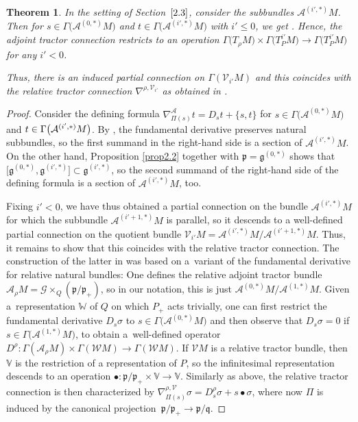 \documentclass[pdftex]{sigma}
\numberwithin{equation}{section}
\newtheorem{Theorem}{Theorem}[section]
\def\frak{\mathfrak}
\def\Bbb{\mathbb}
\def\Cal{\mathcal}
\newcommand{\x}{\times}
\newcommand{\si}{\sigma}
\newcommand{\Ga}{\Gamma}
\begin{document}
\begin{Theorem}\label{thm3.1}
In the setting of Section~$\ref{2.3}$, consider the subbundles $\Cal A^{(i',*)}M$. Then for
${s\in\Ga\bigl(\Cal A^{(0,*)}M\bigr)}$ and $t\in\Ga\bigl(\Cal A^{(i',*)}M\bigr)$ with $i'\leq 0$, we get
\smash{$\nabla^{\Cal A}_{\Pi(s)}t\in\Ga\big(\Cal A^{(i',*)}\big)M$}. Hence, the adjoint tractor
connection restricts to an operation $\Ga\bigl(T_\rho M\bigr)\x\Ga\bigl(T^{i'}_PM\bigr)\to\Ga\bigl(T^{i'}_PM\bigr)$
for any $i'<0$.

Thus, there is an induced partial connection on $\Ga(\Cal V_{i'}M)$ and this
coincides with the relative tractor connection $\nabla^{\rho,\Cal V_{i'}}$ as
obtained in {\rm \cite[{\it Section} 4.3]{Rel-BGG2}}.
\end{Theorem}
\begin{proof}
Consider the defining formula $\nabla^{\Cal A}_{\Pi(s)}t=D_st+\{s,t\}$ for
$s\in\Ga\bigl(\Cal A^{(0,*)}M\bigr)$ and $t\in\Ga\smash{\bigl(\Cal A^{(i',*)}M\bigr)}$. By \cite[Proposition 1.5.8]{book},
the fundamental derivative preserves natural subbundles, so the first
summand in the right-hand side is a section of $\Cal A^{(i',*)}M$. On the other hand,
Proposition \ref{prop2.2} together with $\frak p=\frak g^{(0,*)}$ shows that $\bigl[\frak
 g^{(0,*)},\frak g^{(i',*)}\bigr]\subset \frak g^{(i',*)}$, so the second summand of the
right-hand side of the defining formula is a section of $\Cal A^{(i',*)}M$, too.

Fixing $i'<0$, we have thus obtained a partial connection on the bundle $\Cal
A^{(i',*)}M$ for which the subbundle $\Cal A^{(i'+1,*)}M$ is parallel, so it descends
to a well-defined partial connection on the quotient bundle $\Cal V_{i'}M=\Cal
A^{(i',*)}M/\Cal A^{(i'+1,*)}M$. Thus, it remains to show that this coincides with the
relative tractor connection. The construction of the latter in \cite{Rel-BGG2} was
based on a~variant of the fundamental derivative for relative natural bundles: One
defines the relative adjoint tractor bundle $\Cal A_\rho M=\Cal G\x_Q(\frak p/\frak
p_+)$, so in our notation, this is just $\Cal A^{(0,*)}M/\Cal A^{(1,*)}M$. Given
a~representation $\Bbb W$ of $Q$ on which $P_+$ acts trivially, one can first restrict
the fundamental derivative $D_s\si$ to $s\in\Ga\bigl(\Cal A^{(0,*)}M\bigr)$ and then observe
that $D_s\si=0$ if $s\in\Ga\bigl(\Cal A^{(1,*)}M\bigr)$, to obtain a~well-defined operator
$D^\rho\colon \Ga(\Cal A_\rho M)\x\Ga(\Cal WM)\to\Ga(\Cal WM)$. If $\Cal VM$ is a relative
tractor bundle, then $\Bbb V$ is the restriction of a representation of $P$, so the
infinitesimal representation descends to an operation $\bullet\colon \frak p/\frak
p_+\x\Bbb V\to\Bbb V$. Similarly as above, the relative tractor connection is then
characterized by $\nabla^{\rho,\Cal V}_{\Pi(s)}\si=D^\rho_s \si+s\bullet\si$, where
now $\Pi$ is induced by the canonical projection~${\frak p/\frak p_+\to\frak p/\frak
q}$.


\end{proof}
\end{document}
